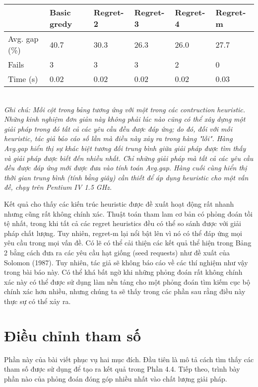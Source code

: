\begin{table}[caption={Performance of Construction Heuristics}, label=tab:2]
    \begin{tabular}{@{}llllll@{}}
        \toprule
                      & Basic gredy & Regret-2 & Regret-3 & Regret-4 & Regret-m \\ \midrule
        Avg. gap (\%) & 40.7        & 30.3     & 26.3     & 26.0     & 27.7     \\
        Fails         & 3           & 3        & 3        & 2        & 0        \\
        Time (s)      & 0.02        & 0.02     & 0.02     & 0.02     & 0.03     \\ \bottomrule
        \end{tabular} \\
        \justify
        \textit{Ghi chú: Mỗi cột trong bảng tương ứng với một trong các contruction heuristic. Những kinh nghiệm đơn giản này không phải lúc nào cũng có thể xây dựng một giải pháp trong đó tất cả các yêu cầu đều được đáp ứng; do đó, đối với mỗi heuristic, tác giả báo cáo số lần mà điều này xảy ra trong hàng "lỗi". Hàng Avg.gap hiển thị sự khác biệt tương đối trung bình giữa giải pháp được tìm thấy và giải pháp được biết đến nhiều nhất. Chỉ những giải pháp mà tất cả các yêu cầu đều được đáp ứng mới được đưa vào tính toán Avg.gap. Hàng cuối cùng hiển thị thời gian trung bình (tính bằng giây) cần thiết để áp dụng heuristic cho một vấn đề, chạy trên Pentium IV 1.5 GHz.}
\end{table}

Kết quả cho thấy các kiến trúc heuristic được đề xuất hoạt động rất nhanh nhưng cũng rất không chính xác. Thuật toán tham lam cơ bản có phỏng đoán tồi tệ nhất, trong khi tất cả các regret heuristics đều có thể so sánh được với giải pháp chất lượng. Tuy nhiên, regret-m lại nổi bật lên vì nó có thể đáp ứng mọi yêu cầu trong mọi vấn đề. Có lẽ có thể cải thiện các kết quả thể hiện trong Bảng 2 bằng cách đưa ra các yêu cầu hạt giống (seed requests) như đề xuất của Solomon (1987). Tuy nhiên, tác giả sẽ không báo cáo về các thí nghiệm như vậy trong bài báo này. Có thể khá bất ngờ khi những phỏng đoán rất không chính xác này có thể được sử dụng làm nền tảng cho một phỏng đoán tìm kiếm cục bộ chính xác hơn nhiều, nhưng chúng ta sẽ thấy trong các phần sau rằng điều này thực sự có thể xảy ra.


\section{Điều chỉnh tham số}
Phần này của bài viết phục vụ hai mục đích. Đầu tiên là mô tả cách tìm thấy các tham số được sử dụng để tạo ra kết quả trong Phần 4.4. Tiếp theo, trình bày phần nào của phỏng đoán đóng góp nhiều nhất vào chất lượng giải pháp.

